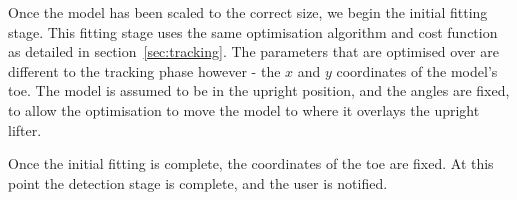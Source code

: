 Once the model has been scaled to the correct size, we begin the initial fitting stage. This fitting stage uses the same optimisation algorithm and cost function as detailed in section~\ref{sec:tracking}. The parameters that are optimised over are different to the tracking phase however - the $x$ and $y$ coordinates of the model's toe. The model is assumed to be in the upright position, and the angles are fixed, to allow the optimisation to move the model to where it overlays the upright lifter.

Once the initial fitting is complete, the coordinates of the toe are fixed. At this point the detection stage is complete, and the user is notified.
